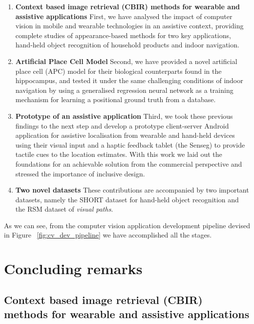\begin{enumerate}
\item \textbf{Context based image retrieval (CBIR) methods for wearable and assistive applications} First, we have analysed the impact of computer vision in mobile and wearable technologies in an assistive context, providing complete studies of appearance-based methods for two key applications, hand-held object recognition of household products and indoor navigation.

\item \textbf{Artificial Place Cell Model} Second, we have provided a novel artificial place cell (APC) model for their biological counterparts found in the hippocampus, and tested it under the same challenging conditions of indoor navigation by using a generalised regression neural network as a training mechanism for learning a positional ground truth from a database.

\item \textbf{Prototype of an assistive application} Third, we took these previous findings to the next step and develop a prototype client-server Android application for assistive localisation from wearable and hand-held devices using their visual input and a haptic feedback tablet (the Senseg\texttrademark) to provide tactile cues to the location estimates. With this work we laid out the foundations for an achievable solution from the commercial perspective and stressed the importance of inclusive design.


\item \textbf{Two novel datasets} These contributions are accompanied by two important datasets, namely the SHORT dataset for hand-held object recognition and the RSM dataset of \emph{visual paths}.
\end{enumerate}

As we can see, from the computer vision application development pipeline devised in Figure ~\ref{fig:cv_dev_pipeline} we have accomplished all the stages.

\section{Concluding remarks}

\subsection{Context based image retrieval (CBIR) methods for wearable and assistive applications}

